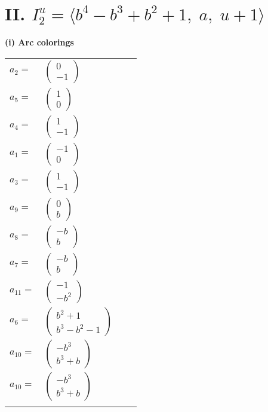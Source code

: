 \documentclass[1p]{elsarticle_modified}
\theoremstyle{definition}
\begin{document}
\centering \section*{II. $I^u_{2}= \langle b^4- b^3+b^2+1,\;a,\;u+1 \rangle$}
\flushleft \textbf{(i) Arc colorings}\\
\begin{tabular}{m{7pt} m{180pt} m{7pt} m{180pt} }
\flushright $a_{2}=$&$\begin{pmatrix}0\\-1\end{pmatrix}$ \\
\flushright $a_{5}=$&$\begin{pmatrix}1\\0\end{pmatrix}$ \\
\flushright $a_{4}=$&$\begin{pmatrix}1\\-1\end{pmatrix}$ \\
\flushright $a_{1}=$&$\begin{pmatrix}-1\\0\end{pmatrix}$ \\
\flushright $a_{3}=$&$\begin{pmatrix}1\\-1\end{pmatrix}$ \\
\flushright $a_{9}=$&$\begin{pmatrix}0\\b\end{pmatrix}$ \\
\flushright $a_{8}=$&$\begin{pmatrix}- b\\b\end{pmatrix}$ \\
\flushright $a_{7}=$&$\begin{pmatrix}- b\\b\end{pmatrix}$ \\
\flushright $a_{11}=$&$\begin{pmatrix}-1\\- b^2\end{pmatrix}$ \\
\flushright $a_{6}=$&$\begin{pmatrix}b^2+1\\b^3- b^2-1\end{pmatrix}$ \\
\flushright $a_{10}=$&$\begin{pmatrix}- b^3\\b^3+b\end{pmatrix}$\\ \flushright $a_{10}=$&$\begin{pmatrix}- b^3\\b^3+b\end{pmatrix}$\\&\end{tabular}
\end{document}
